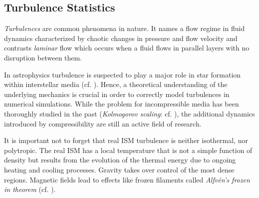 \subsection{Turbulence Statistics}
\label{sec:turbulence}

\emph{Turbulences} are common phenomena in nature. It names a flow regime in
fluid dynamics characterized by chaotic changes in pressure and flow velocity
and contrasts \emph{laminar} flow which occurs when a fluid flows in parallel
layers with no disruption between them.

In astrophysics turbulence is suspected to play a major role in star formation
within interstellar media (cf. \cite{klessen2016physical}).  Hence, a
theoretical understanding of the underlying mechanics is crucial in order to
correctly model turbulences in numerical simulations. While the problem for
incompressible media has been thoroughly studied in the past (\emph{Kolmogorov
scaling}: cf. ), the additional dynamics introduced
by compressibility are still an active field of research.

It is important not to forget that real ISM turbulence is neither isothermal,
nor polytropic. The real ISM has a local temperature that is not a simple
function of density but results from the evolution of the thermal energy due to
ongoing heating and cooling processes. Gravity takes over control of the most
dense regions. Magnetic fields lead to effects like frozen filaments called
\emph{Alfvén's frozen in theorem} (cf.  \cite{roberts2007alfven}).

% 


